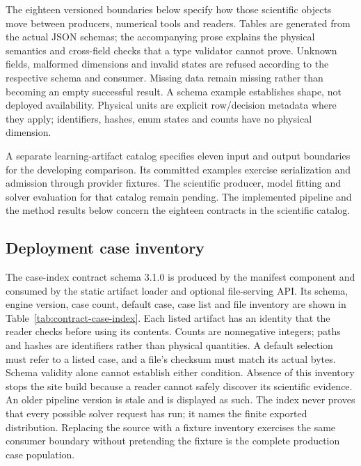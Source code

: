 The eighteen versioned boundaries below specify how those scientific objects
move between producers, numerical tools and readers. Tables are generated from
the actual JSON schemas; the accompanying prose explains the physical semantics
and cross-field checks that a type validator cannot prove. Unknown fields,
malformed dimensions and invalid states are refused according to the respective
schema and consumer. Missing data remain missing rather than becoming an empty
successful result. A schema example establishes shape, not deployed availability.
Physical units are explicit row/decision metadata where they apply; identifiers,
hashes, enum states and counts have no physical dimension.

A separate learning-artifact catalog specifies eleven input and output
boundaries for the developing comparison. Its committed examples exercise
serialization and admission through provider fixtures. The scientific
producer, model fitting and solver evaluation for that catalog remain
pending. The implemented pipeline and the method results below concern
the eighteen contracts in the scientific catalog.

\subsection{Deployment case inventory}\label{sec:contract-case-index}
The case-index contract schema 3.1.0 is produced by the manifest component and
consumed by the static artifact loader and optional file-serving API. Its schema,
engine version, case count, default case, case list and file inventory are shown
in Table~\ref{tab:contract-case-index}. Each listed artifact has an identity that
the reader checks before using its contents. Counts are nonnegative integers;
paths and hashes are identifiers rather than physical quantities. A default
selection must refer to a listed case, and a file's checksum must match its
actual bytes. Schema validity alone cannot establish either condition. Absence
of this inventory stops the site build because a reader cannot safely discover
its scientific evidence. An older pipeline version is stale and is displayed
as such. The index never proves that every possible solver request has run;
it names the finite exported distribution. Replacing the source with a fixture
inventory exercises the same consumer boundary without pretending the fixture
is the complete production case population.


